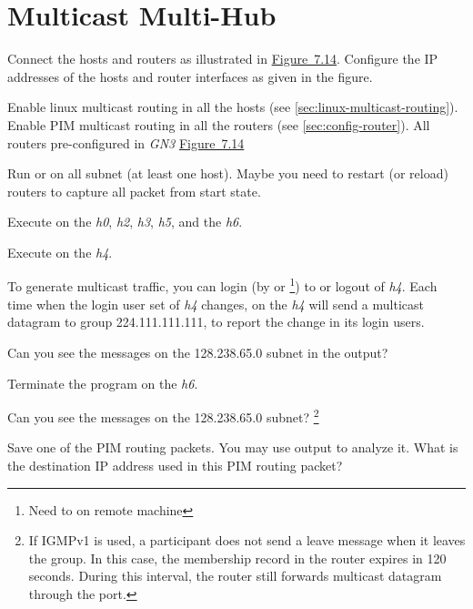 \documentclass{../UTNetLab}
\begin{document}
\section{Multicast Multi-Hub}
Connect the hosts and routers as illustrated in \hyperref[fig:7.14]{Figure~7.14}.
Configure the IP addresses of the hosts and router interfaces as given in the figure.


Enable linux multicast routing in all the hosts (see \autoref{sec:linux-multicast-routing}).
Enable PIM multicast routing in all the routers (see \autoref{sec:config-router}).
All routers pre-configured in \textit{GN3} \hyperref[fig:7.14]{Figure~7.14}

Run  or  on all subnet (at least one host).
Maybe you need to restart (or reload) routers to capture all packet from start state.

Execute  on the \textit{h0}, \textit{h2}, \textit{h3}, \textit{h5}, and the \textit{h6}.

Execute  on the \textit{h4}.

To generate multicast traffic, you can login (by  or \footnote{Need to  on remote machine}) to or logout of \textit{h4}.
Each time when the login user set of \textit{h4} changes,  on the \textit{h4} will send a multicast datagram to group 224.111.111.111, to report the change in its login users.

Can you see the  messages on the 128.238.65.0 subnet in the  output?

Terminate the  program on the \textit{h6}.

Can you see the  messages on the 128.238.65.0 subnet?
\footnote{If IGMPv1 is used, a participant does not send a leave message when it leaves the group.
    In this case, the membership record in the router expires in 120 seconds.
    During this interval, the router still forwards multicast datagram through the port.}

Save one of the PIM routing packets.
You may use  output to analyze it.
What is the destination IP address used in this PIM routing packet?
\end{document}

